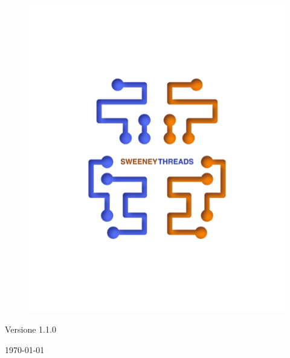 \documentclass[a4paper]{report}
\begin{document}
\begin{titlepage}
		\begin{figure}[H]
			\centering
			\includegraphics[scale=0.8]{sweeney.png}
		\end{figure}
		\begin{center}
			Versione 1.1.0
		\end{center}
		{\large \today}\\[3cm] 
		\vfill  
	\end{titlepage}
	
	\tableofcontents
	
\end{document}
